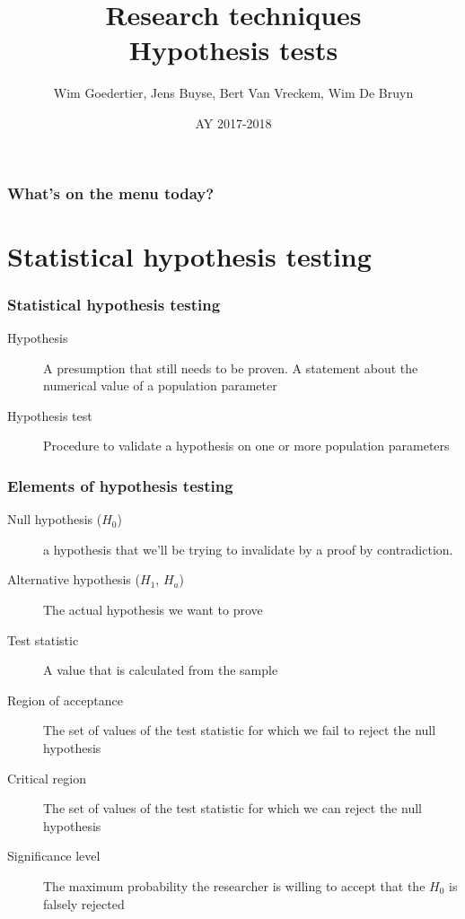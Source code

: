 \documentclass{beamer}
\title[Hypothesis tests]{Research techniques\\Hypothesis tests}
\author{Wim Goedertier, Jens Buyse, Bert {Van Vreckem}, Wim {De Bruyn}}
\date{AY 2017-2018}
\begin{document}

\HoGentLogo

\titleframe



\begin{frame}
  \frametitle{What's on the menu today?}

  \tableofcontents
\end{frame}

\section{Statistical hypothesis testing}
\sectionframelogo{}

\begin{frame}
  \frametitle{Statistical hypothesis testing}

  \begin{description}
    \item[Hypothesis] A presumption that still needs to be proven. A statement about the numerical value of a population parameter
    \item[Hypothesis test] Procedure to validate a hypothesis on one or more population parameters
  \end{description}
\end{frame}

\begin{frame}
  \frametitle{Elements of hypothesis testing}

  \begin{description}
    \item[Null hypothesis ($H_0$)] a hypothesis that we'll be trying to invalidate by a proof by contradiction.
    \item[Alternative hypothesis ($H_1$, $H_a$)] The actual hypothesis we want to prove
    \item[Test statistic] A value that is calculated from the sample
    \item[Region of acceptance] The set of values of the test statistic for which we fail to reject the null hypothesis
    \item[Critical region] The set of values of the test statistic for which we can reject the null hypothesis
    \item[Significance level] The maximum probability the researcher is willing to accept that the $H_0$ is falsely rejected
  \end{description}
\end{frame}
\end{document}

